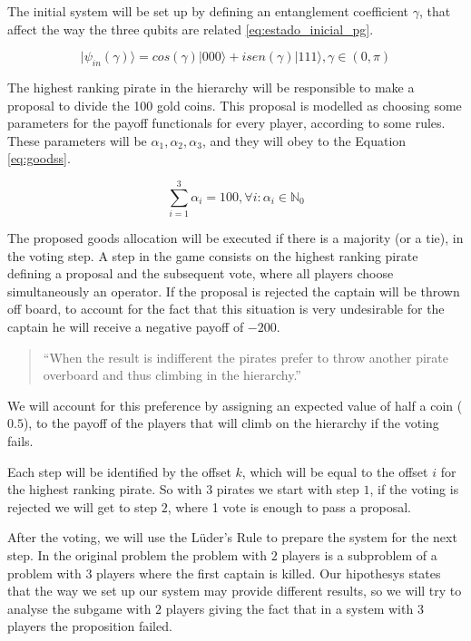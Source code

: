 The initial system will be set up by defining an entanglement coefficient $\gamma$, that affect the way the three qubits are related \ref{eq:estado_inicial_pg}.
 
\begin{equation}
\label{eq:estado_inicial_pg}
\vert \psi_{in}(\gamma) \rangle= cos( \gamma)\vert 000\rangle+ isen(\gamma)\vert 111 \rangle, \gamma \in (0,\pi)
\end{equation}

The highest ranking pirate in the hierarchy will be responsible to make a proposal to divide the 100 gold coins. This proposal is modelled as choosing some parameters for the payoff functionals for every player, according to some rules. These parameters will be $\alpha_{1}, \alpha_{2}, \alpha_{3}$, and they will obey to the Equation \ref{eq:goodss}.

\begin{equation}
\label{eq:goodss}
\sum_{i=1}^{3}\alpha_{i}=100, \forall i :\alpha_{i}\in\mathbb{N}_{0}
\end{equation}

The proposed goods allocation will be executed if there is a majority (or a tie), in the voting step. A step in the game consists on the highest ranking pirate defining a proposal and the subsequent vote, where all players choose simultaneously an operator. If the proposal is rejected the captain will be thrown off board, to account for the fact that this situation is very undesirable for the captain he will receive a negative payoff of $-200$.

\begin{quotation}
``When the result is indifferent the pirates prefer to throw another pirate overboard and thus climbing in the hierarchy.''
\end{quotation}

We will account for this preference by assigning an expected value of half a coin ($0.5$), to the payoff of the players that will climb on the hierarchy if the voting fails.

Each step will be identified by the offset $k$, which will be equal to the offset $i$ for the highest ranking pirate. So with $3$ pirates we start with step $1$, if the voting is rejected we will get to step $2$, where 1 vote is enough to pass a proposal.

After the voting, we will use the L\"{u}der's Rule to prepare the system for the next step. In the original problem the problem with $2$ players is a subproblem of a problem with $3$ players where the first captain is killed. Our hipothesys states that the way we set up our system may provide different results, so we will try to analyse the subgame with $2$ players giving the fact that in a system with $3$ players the proposition failed. 

